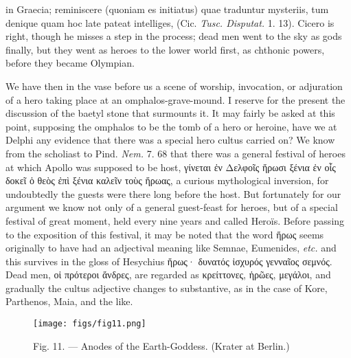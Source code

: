 \documentclass[a4paper, 11pt, oneside, polutonikogreek, english]{article}
\begin{document}
in Graecia; reminiscere (quoniam es initiatus) quae traduntur mysteriis, tum denique quam hoc late pateat intelliges, (Cic. \emph{Tusc. Disputat.} 1. 13). Cicero is right, though he misses a step in the process; dead men went to the sky as gods finally, but they went as heroes to the lower world first, as chthonic powers, before they became Olympian.

We have then in the vase before us a scene of worship, invocation, or adjuration of a hero taking place at an omphalos-grave-mound. I reserve for the present the discussion of the baetyl stone that surmounts it. It may fairly be asked at this point, supposing the omphalos to be the tomb of a hero or heroine, have we at Delphi any evidence that there was a special hero cultus carried on? We know from the scholiast to Pind. \emph{Nem.} 7. 68 that there was a general festival of heroes at which Apollo was supposed to be host, γίνεται ἐν Δελφοῖς ἥρωσι ξένια ἐν οἷς δοκεῖ ὁ θεὸς ἐπὶ ξένια καλεῖν τοὺς ἥρωας, a curious mythological inversion, for undoubtedly the guests were there long before the host. But fortunately for our argument we know not only of a general guest-feast for heroes, but of a special festival of great moment, held every nine years and called Heroïs. Before passing to the exposition of this festival, it may be noted that the word ἥρως seems originally to have had an adjectival meaning like Semnae, Eumenides, \emph{etc.} and this survives in the gloss of Hesychius ἥρως· δυνατός ἰσχυρός γενναῖος σεμνός. Dead men, οἱ πρότεροι ἄνδρες, are regarded as κρείττονες, ἡρῶες, μεγάλοι, and gradually the cultus adjective changes to substantive, as in the case of Kore, Parthenos, Maia, and the like.
\begin{figure}[H]
\centering
\texttt{[image: figs/fig11.png]}
\caption{\Fontauri Fig. 11. --- Anodes of the Earth-Goddess. (Krater at Berlin.)}
\end{figure}
\end{document}
